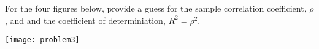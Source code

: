 \item For the four figures below, provide a guess for the sample correlation
coefficient, $\rho$, and and the coefficient of determiniation, $R^2=\rho^2$.  

\texttt{[image: problem3]}

